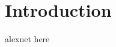 \chapter{Introduction}\label{sec-introduction}

alexnet \cite{krizhevsky2012imagenet} here


\newpage
